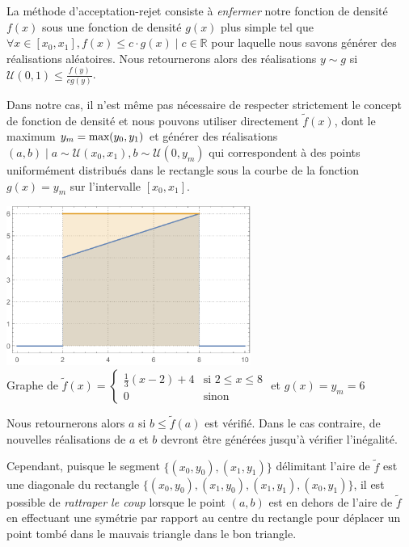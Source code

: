 \documentclass[a4paper,11pt]{report}
\begin{document}
\begin{enumerate}[\indent a)]
La méthode d'acceptation-rejet consiste à \emph{enfermer} notre fonction de densité $f(x)$ sous une fonction de densité $g(x)$ plus simple tel que $\forall x \in [x_0,x_1], f(x) \leq c \cdot g(x) \mid c \in \mathbb{R}$ pour laquelle nous savons générer des réalisations aléatoires. Nous retournerons alors des réalisations $y \sim g$ si $\mathcal{U}(0,1) \leq \frac{f(y)}{cg(y)}$.

Dans notre cas, il n'est même pas nécessaire de respecter strictement le concept de fonction de densité et nous pouvons utiliser directement $\tilde{f}(x)$, dont le maximum $y_m = \textnormal{max}(y_0, y_1)$ et générer des réalisations $(a,b) \mid a \sim \mathcal{U}(x_0, x_1), b \sim \mathcal{U}(0, y_m)$ qui correspondent à des points uniformément distribués dans le rectangle sous la courbe de la fonction $g(x)=y_m$ sur l'intervalle $[x_0, x_1]$.

\begin{center}
	\includegraphics[width=8cm]{img_graph3}\\
	{\footnotesize Graphe de $\tilde{f}(x) = \left\lbrace \begin{array}{ll}
		\frac{1}{3} ( x - 2 ) + 4 & \text{si $2 \leq x \leq 8$} \\
		0 						& \text{sinon}
		\end{array} \right.$ et $g(x)=y_m=6$}
\end{center}

Nous retournerons alors $a$ si $b \leq \tilde{f}(a)$ est vérifié. Dans le cas contraire, de nouvelles réalisations de $a$ et $b$ devront être générées jusqu'à vérifier l'inégalité.

Cependant, puisque le segment $\big\lbrace (x_0,y_0) , (x_1,y_1) \big\rbrace$ délimitant l'aire de $\tilde{f}$ est une diagonale du rectangle $\big\lbrace (x_0,y_0) , (x_1,y_0) , (x_1,y_1) , (x_0,y_1) \big\rbrace$, il est possible de \emph{rattraper le coup} lorsque le point $(a,b)$ est en dehors de l'aire de $\tilde{f}$ en effectuant une symétrie par rapport au centre du rectangle pour déplacer un point tombé dans le mauvais triangle dans le bon triangle.


\end{enumerate}
\end{document}
